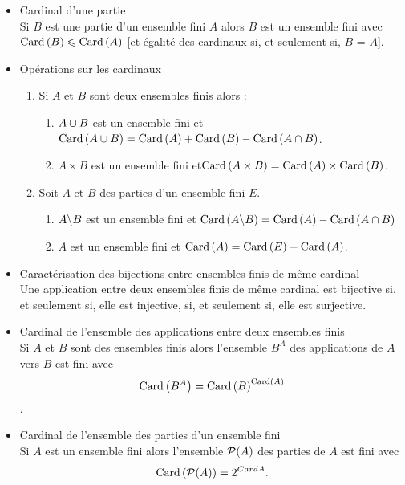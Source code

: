 \begin{prop}
    \begin{itemize}
        \item Cardinal d’une partie\\
            Si \(B\) est une partie d’un ensemble fini \(A\) alors \(B\) est un ensemble fini avec \(\Card{B} \leq \Card{A}\) [et égalité des cardinaux si, et seulement si, \(B\) = \(A\)].
        \item Opérations sur les cardinaux
        \begin{enumerate}
            \item Si \(A\) et \(B\) sont deux ensembles finis alors :
                \begin{enumerate}
                    \item \(A \union B\) est un ensemble fini et \(\Card{A \union B} = \Card{A} + \Card{B} - \Card{A \inter B}\).
                    \item \(A \times B\) est un ensemble fini et\( \Card{A \times B} = \Card{A} \times \Card{B}\).
                \end{enumerate}
            \item Soit \(A\) et \(B\) des parties d’un ensemble fini \(E\).
                \begin{enumerate}
                    \item \(A\pd B\) est un ensemble fini et \(\Card{A\pd B} = \Card{A} - \Card{A \inter B}\)
                    \item \(A\) est un ensemble fini et \(\Card{A} = \Card{E} - \Card{A}\).
                \end{enumerate}
        \end{enumerate}
        \item Caractérisation des bijections entre ensembles finis de même cardinal\\
            Une application entre deux ensembles finis de même cardinal est bijective si, et seulement si, elle est injective, si, et seulement si, elle est surjective.
        \item Cardinal de l’ensemble des applications entre deux ensembles finis\\
            Si \(A\) et \(B\) sont des ensembles finis alors l’ensemble \(B^A\) des applications de \(A\) vers \(B\) est fini avec
            \[\Card{B^A} = \Card{B}^{\Card{A}}\] .
        \item Cardinal de l’ensemble des parties d’un ensemble fini\\
            Si \(A\) est un ensemble fini alors l’ensemble \(\cal{P}(A)\) des parties de \(A\) est fini avec
            \[\Card{\cal{P}(A)} = 2^{Card{A}}.\]
    \end{itemize}
\end{prop}
